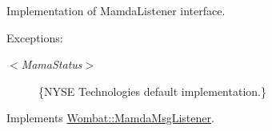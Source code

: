 Implementation of Mamda\-Listener interface. 

\par
 \begin{Desc}
\item[Exceptions:]
\begin{description}
\item[{\em $<$Mama\-Status$>$}]\{NYSE Technologies default implementation.\} \end{description}
\end{Desc}


Implements \hyperlink{classWombat_1_1MamdaMsgListener_c700829ebcce095b95b8b67b39a1c67d}{Wombat::Mamda\-Msg\-Listener}.
